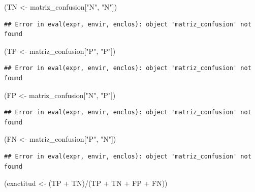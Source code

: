 \documentclass[
  12pt,
]{book}
\newenvironment{Shaded}{\begin{snugshade}}{\end{snugshade}}
\newcommand{\NormalTok}[1]{#1}
\newcommand{\OtherTok}[1]{\textcolor[rgb]{0.56,0.35,0.01}{#1}}
\newcommand{\SpecialCharTok}[1]{\textcolor[rgb]{0.00,0.00,0.00}{#1}}
\newcommand{\StringTok}[1]{\textcolor[rgb]{0.31,0.60,0.02}{#1}}
\theoremstyle{definition}
\theoremstyle{definition}
\theoremstyle{definition}
\theoremstyle{definition}
\theoremstyle{remark}
\begin{document}
\begin{Shaded}
\begin{Highlighting}[]
\NormalTok{(TN }\OtherTok{\textless{}{-}}\NormalTok{ matriz\_confusion[}\StringTok{"N"}\NormalTok{, }\StringTok{"N"}\NormalTok{])}
\end{Highlighting}
\end{Shaded}

\begin{verbatim}
## Error in eval(expr, envir, enclos): object 'matriz_confusion' not found
\end{verbatim}

\begin{Shaded}
\begin{Highlighting}[]
\NormalTok{(TP }\OtherTok{\textless{}{-}}\NormalTok{ matriz\_confusion[}\StringTok{"P"}\NormalTok{, }\StringTok{"P"}\NormalTok{])}
\end{Highlighting}
\end{Shaded}

\begin{verbatim}
## Error in eval(expr, envir, enclos): object 'matriz_confusion' not found
\end{verbatim}

\begin{Shaded}
\begin{Highlighting}[]
\NormalTok{(FP }\OtherTok{\textless{}{-}}\NormalTok{ matriz\_confusion[}\StringTok{"N"}\NormalTok{, }\StringTok{"P"}\NormalTok{])}
\end{Highlighting}
\end{Shaded}

\begin{verbatim}
## Error in eval(expr, envir, enclos): object 'matriz_confusion' not found
\end{verbatim}

\begin{Shaded}
\begin{Highlighting}[]
\NormalTok{(FN }\OtherTok{\textless{}{-}}\NormalTok{ matriz\_confusion[}\StringTok{"P"}\NormalTok{, }\StringTok{"N"}\NormalTok{])}
\end{Highlighting}
\end{Shaded}

\begin{verbatim}
## Error in eval(expr, envir, enclos): object 'matriz_confusion' not found
\end{verbatim}

\begin{Shaded}
\begin{Highlighting}[]
\NormalTok{(exactitud }\OtherTok{\textless{}{-}}\NormalTok{ (TP }\SpecialCharTok{+}\NormalTok{ TN)}\SpecialCharTok{/}\NormalTok{(TP }\SpecialCharTok{+}\NormalTok{ TN }\SpecialCharTok{+}\NormalTok{ FP }\SpecialCharTok{+}\NormalTok{ FN))}
\end{Highlighting}
\end{Shaded}
\end{document}
